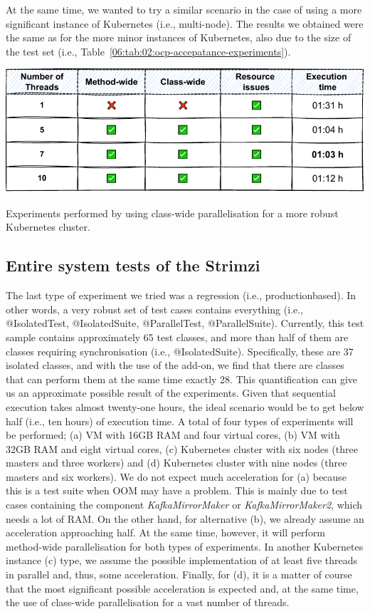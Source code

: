 At the same time, we wanted to try a similar scenario in the case of using a more significant instance of Kubernetes (i.e., multi-node).
The results we obtained were the same as for the more minor instances of Kubernetes, also due to the size of the test set
(i.e., Table~\ref{06:tab:02:ocp-accepatance-experiments}).
\begin{table}[ht!]
    \centering
    \includegraphics[scale=0.8]{obrazky-figures/08-experiments/acceptance/06-exp-ocp-accpetance-second}
    \caption{Experiments performed by using class-wide parallelisation for a more robust Kubernetes cluster.}
    \label{06:tab:02:ocp-accepatance-experiments}
\end{table}

\subsection{Entire system tests of the Strimzi}
\label{06:subsec:regression-experiments}
The last type of experiment we tried was a regression (i.e., production\-based).
In other words, a very robust set of test cases contains everything (i.e., @IsolatedTest, @IsolatedSuite,
@ParallelTest, @ParallelSuite).
Currently, this test sample contains approximately 65 test classes, and more than half of them are classes
requiring synchronisation (i.e., @IsolatedSuite).
Specifically, these are 37 isolated classes, and with the use of the add-on, we find that there are classes that
can perform them at the same time exactly 28.
This quantification can give us an approximate possible result of the experiments.
Given that sequential execution takes almost twenty-one hours, the ideal scenario would be to get below half
(i.e., ten hours) of execution time.
A total of four types of experiments will be performed; (a) VM with 16GB RAM and four virtual cores,
(b) VM with 32GB RAM and eight virtual cores, (c) Kubernetes cluster with six nodes (three masters and three workers)
and (d) Kubernetes cluster with nine nodes (three masters and six workers).
We do not expect much acceleration for (a) because this is a test suite when OOM may have a problem.
This is mainly due to test cases containing the component \emph{KafkaMirrorMaker} or \emph{KafkaMirrorMaker2}, which
needs a lot of RAM. On the other hand, for alternative (b), we already assume an acceleration approaching half.
At the same time, however, it will perform method-wide parallelisation for both types of experiments.
In another Kubernetes instance (c) type, we assume the possible implementation of at least five threads
in parallel and, thus, some acceleration.
Finally, for (d), it is a matter of course that the most significant possible acceleration is expected and,
at the same time, the use of class-wide parallelisation for a vast number of threads.

